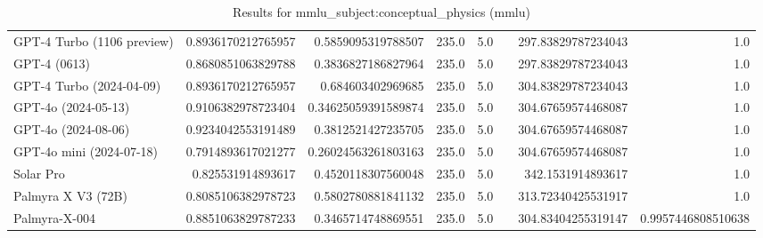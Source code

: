 \begin{table}[htp]
{\begin{tabular}{lrrrrrrr}
GPT-4 Turbo (1106 preview) & 0.8936170212765957 & 0.5859095319788507 & 235.0 & 5.0 &  & 297.83829787234043 & 1.0 \\
GPT-4 (0613) & 0.8680851063829788 & 0.3836827186827964 & 235.0 & 5.0 &  & 297.83829787234043 & 1.0 \\
GPT-4 Turbo (2024-04-09) & 0.8936170212765957 & 0.684603402969685 & 235.0 & 5.0 &  & 304.83829787234043 & 1.0 \\
GPT-4o (2024-05-13) & 0.9106382978723404 & 0.34625059391589874 & 235.0 & 5.0 &  & 304.67659574468087 & 1.0 \\
GPT-4o (2024-08-06) & 0.9234042553191489 & 0.3812521427235705 & 235.0 & 5.0 &  & 304.67659574468087 & 1.0 \\
GPT-4o mini (2024-07-18) & 0.7914893617021277 & 0.26024563261803163 & 235.0 & 5.0 &  & 304.67659574468087 & 1.0 \\
Solar Pro & 0.825531914893617 & 0.4520118307560048 & 235.0 & 5.0 &  & 342.1531914893617 & 1.0 \\
Palmyra X V3 (72B) & 0.8085106382978723 & 0.5802780881841132 & 235.0 & 5.0 &  & 313.72340425531917 & 1.0 \\
Palmyra-X-004 & 0.8851063829787233 & 0.3465714748869551 & 235.0 & 5.0 &  & 304.83404255319147 & 0.9957446808510638 \\
\bottomrule
\end{tabular}}
\caption{Results for mmlu_subject:conceptual_physics (mmlu)}
\label{fig:mmlu_subject:conceptual_physics (mmlu)}
\end{table}